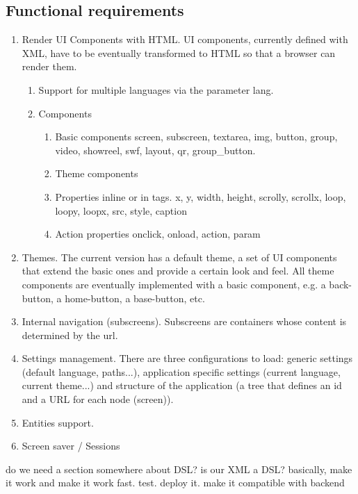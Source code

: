\subsection{Functional requirements}
\begin{enumerate}
    \item Render \ac{UI} Components with \ac{HTML}. \ac{UI} components, currently defined with \ac{XML}, have to be eventually transformed to \ac{HTML} so that a browser can render them.
    \begin{enumerate}
        \item Support for multiple languages via the parameter lang.
        \item Components 
        \begin{enumerate}
            \item Basic components screen, subscreen, textarea, img, button, group, video, showreel, swf, layout, qr, group\_button.
            \item Theme components
            \item Properties inline or in tags. x, y, width, height, scrolly, scrollx, loop, loopy, loopx, src, style, caption
            \item Action properties onclick, onload, action, param
        \end{enumerate}
        
    \end{enumerate}
    \item Themes. The current version has a default theme, a set of UI components that extend the basic ones and provide a certain look and feel. All theme components are eventually implemented with a basic component, e.g. a back-button, a home-button, a base-button, etc.
    \item Internal navigation (subscreens). Subscreens are containers whose content is determined by the url.
    \item Settings management. There are three configurations to load: generic settings (default language, paths...), application specific settings (current language, current theme...) and structure of the application (a tree that defines an id and a \ac{URL} for each node (screen)).
    \item Entities support. 
    \item Screen saver / Sessions
\end{enumerate}


do we need a section somewhere about DSL? is our XML a DSL?
basically, make it work and make it work fast. test. deploy it. make it compatible with backend

